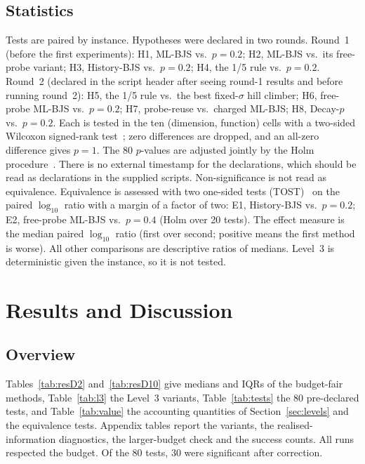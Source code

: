 \documentclass[conference]{IEEEtran}
\begin{document}
\subsection{Statistics}
Tests are paired by instance. Hypotheses were declared in two rounds. Round~1 (before the first experiments): H1, ML-BJS vs.\ $p=0.2$; H2, ML-BJS vs.\ its free-probe variant; H3, History-BJS vs.\ $p=0.2$; H4, the 1/5 rule vs.\ $p=0.2$. Round~2 (declared in the script header after seeing round-1 results and before running round~2): H5, the 1/5 rule vs.\ the best fixed-$\sigma$ hill climber; H6, free-probe ML-BJS vs.\ $p=0.2$; H7, probe-reuse vs.\ charged ML-BJS; H8, Decay-$p$ vs.\ $p=0.2$. Each is tested in the ten (dimension, function) cells with a two-sided Wilcoxon signed-rank test~\cite{wilcoxon1945}; zero differences are dropped, and an all-zero difference gives $p=1$. The 80 $p$-values are adjusted jointly by the Holm procedure~\cite{holm1979}. There is no external timestamp for the declarations, which should be read as declarations in the supplied scripts. Non-significance is not read as equivalence. Equivalence is assessed with two one-sided tests (TOST)~\cite{schuirmann1987} on the paired $\log_{10}$ ratio with a margin of a factor of two: E1, History-BJS vs.\ $p=0.2$; E2, free-probe ML-BJS vs.\ $p=0.4$ (Holm over 20 tests). The effect measure is the median paired $\log_{10}$ ratio (first over second; positive means the first method is worse). All other comparisons are descriptive ratios of medians. Level~3 is deterministic given the instance, so it is not tested.

\section{Results and Discussion}
\subsection{Overview}
Tables~\ref{tab:resD2} and~\ref{tab:resD10} give medians and IQRs of the budget-fair methods, Table~\ref{tab:l3} the Level~3 variants, Table~\ref{tab:tests} the 80 pre-declared tests, and Table~\ref{tab:value} the accounting quantities of Section~\ref{sec:levels} and the equivalence tests. Appendix tables report the variants, the realised-information diagnostics, the larger-budget check and the success counts. All runs respected the budget. Of the 80 tests, 30 were significant after correction.
\end{document}
